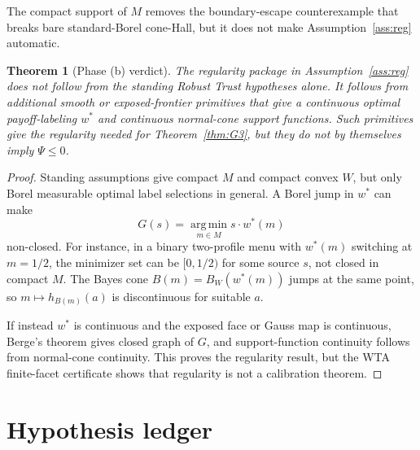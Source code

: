 \documentclass[11pt]{article}
\newtheorem{theorem}{Theorem}
\theoremstyle{definition}
\theoremstyle{remark}
\newcommand{\argmin}{\operatorname*{arg\,min}}
\begin{document}
The compact support of $M$ removes the boundary-escape counterexample that breaks bare standard-Borel cone-Hall, but it does not make Assumption~\ref{ass:reg} automatic.

\begin{theorem}[Phase (b) verdict]\label{thm:phaseb}
The regularity package in Assumption~\ref{ass:reg} does not follow from the standing Robust Trust hypotheses alone. It follows from additional smooth or exposed-frontier primitives that give a continuous optimal payoff-labeling $w^*$ and continuous normal-cone support functions. Such primitives give the regularity needed for Theorem~\ref{thm:G3}, but they do not by themselves imply $\Psi\le0$.
\end{theorem}

\begin{proof}
Standing assumptions give compact $M$ and compact convex $W$, but only Borel measurable optimal label selections in general. A Borel jump in $w^*$ can make
\[
  G(s)=\argmin_{m\in M}s\cdot w^*(m)
\]
non-closed. For instance, in a binary two-profile menu with $w^*(m)$ switching at $m=1/2$, the minimizer set can be $[0,1/2)$ for some source $s$, not closed in compact $M$. The Bayes cone $B(m)=B_W(w^*(m))$ jumps at the same point, so $m\mapsto h_{B(m)}(a)$ is discontinuous for suitable $a$.

If instead $w^*$ is continuous and the exposed face or Gauss map is continuous, Berge's theorem gives closed graph of $G$, and support-function continuity follows from normal-cone continuity. This proves the regularity result, but the WTA finite-facet certificate shows that regularity is not a calibration theorem.
\end{proof}

\section{Hypothesis ledger}\label{sec:ledger}
\end{document}

